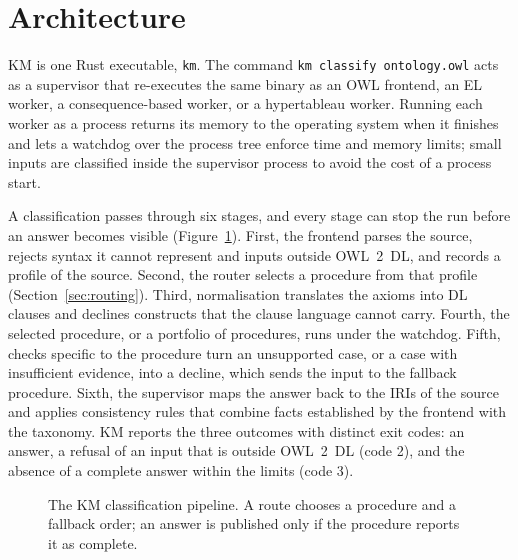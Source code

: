 \section{Architecture}
\label{sec:overview}

KM is one Rust executable, \texttt{km}.  The command \texttt{km classify
ontology.owl} acts as a supervisor that re-executes the same binary as an OWL
frontend, an EL worker, a consequence-based worker, or a hypertableau worker.
Running each worker as a process returns its memory to the operating system
when it finishes and lets a watchdog over the process tree enforce time and
memory limits; small inputs are classified inside the supervisor process to
avoid the cost of a process start.

A classification passes through six stages, and every stage can stop the run
before an answer becomes visible (Figure~\ref{fig:pipeline}).  First, the
frontend parses the source, rejects syntax it cannot represent and inputs
outside OWL~2~DL, and records a profile of the source.  Second, the router
selects a procedure from that profile (Section~\ref{sec:routing}).  Third,
normalisation translates the axioms into DL clauses and declines constructs
that the clause language cannot carry.  Fourth, the selected procedure, or a
portfolio of procedures, runs under the watchdog.  Fifth, checks specific to
the procedure turn an unsupported case, or a case with insufficient evidence,
into a decline, which sends the input to the fallback procedure.  Sixth, the
supervisor maps the answer back to the IRIs of the source and applies
consistency rules that combine facts established by the frontend with the
taxonomy.  KM reports the three outcomes with distinct exit codes: an answer,
a refusal of an input that is outside OWL~2~DL (code 2), and the absence of a
complete answer within the limits (code 3).

\begin{figure}[t]
\centering
{}
\caption{The KM classification pipeline.  A route chooses a procedure and a
fallback order; an answer is published only if the procedure reports it as
complete.}
\label{fig:pipeline}
\end{figure}

